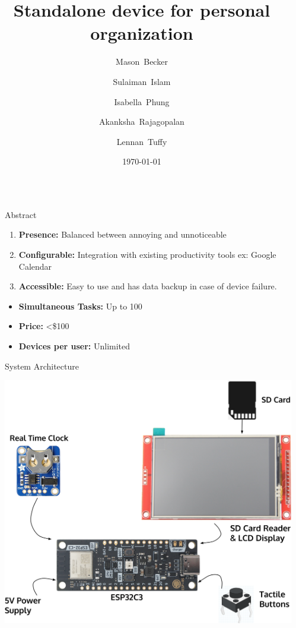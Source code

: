 \documentclass[final]{beamer}
\title{Standalone device for personal organization}
\author{
  Mason~Becker
  \and
  Sulaiman~Islam
  \and
  Isabella~Phung
  \and
  Akanksha~Rajagopalan
  \and
  Lennan~Tuffy
}
\institute[UC Santa Cruz]{CSE 123 - Supervised by Prof. David Harrison}
\date{\today}
\newlength{\sepwidth}
\newlength{\colwidth}
\newcommand{\separatorcolumn}{\begin{column}{\sepwidth}\end{column}}
\begin{document}
\begin{frame}[t]
  \begin{columns}[t]
    \separatorcolumn

    \begin{column}{\colwidth}

      \begin{block}{Abstract}
        \begin{enumerate}
          \item \textbf{Presence:} Balanced between annoying and unnoticeable
          \item \textbf{Configurable:} Integration with existing productivity tools ex: Google Calendar
          \item \textbf{Accessible:} Easy to use and has data backup in case of device failure.
        \end{enumerate}
        \begin{itemize}
          \item \textbf{Simultaneous Tasks:} Up to 100
          \item \textbf{Price:} <\$100
          \item \textbf{Devices per user:} Unlimited
        \end{itemize}
      \end{block}

      \begin{block}{System Architecture}
        \begin{center}
          \includegraphics[width = 0.9 \textwidth]{PrototypeDesign.png}
        \end{center}
   

\end{block}
\end{column}
\end{columns}
\end{frame}
\end{document}
